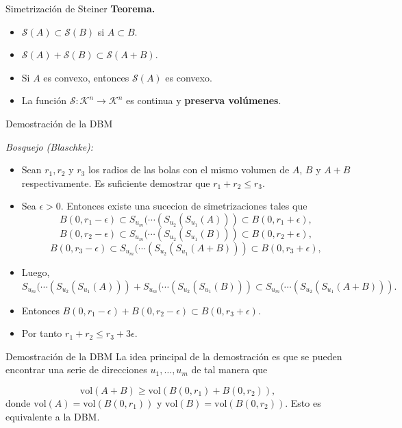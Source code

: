 \documentclass{beamer}
\newcommand{\vol}{\mathrm{vol}}
\begin{document}
\begin{frame}{Simetrización de Steiner}
\textbf{Teorema.}
    \begin{itemize}
        \item $\mathcal{S}(A) \subset \mathcal{S}(B)$ si $A \subset B$.
        \item $\mathcal{S}(A) + \mathcal{S}(B) \subset \mathcal{S}(A+B).$
        \item Si $A$ es convexo, entonces $\mathcal{S}(A)$ es convexo.
        \item La función $\mathcal{S}: \mathcal{K}^n \rightarrow \mathcal{K}^n$ es continua y \textbf{preserva volúmenes}. 
    \end{itemize}
\end{frame}


\begin{frame}{Demostración de la DBM}

\textit{Bosquejo (Blaschke):}
\begin{itemize}[<+->]
    \item Sean $r_1, r_2$ y $r_3$ los radios de las bolas con el mismo volumen de $A$, $B$ y $A+B$ respectivamente. Es suficiente demostrar que $r_1 + r_2 \leq r_3.$
    \item Sea $\epsilon > 0$. Entonces existe una sucecion de simetrizaciones tales que 
    $$B(0, r_1-\epsilon) \subset S_{u_m}(\cdots (S_{u_2}(S_{u_1}(A))) \subset B(0, r_1 + \epsilon),$$
    $$B(0, r_2-\epsilon) \subset S_{u_m}(\cdots (S_{u_2}(S_{u_1}(B))) \subset B(0, r_2 + \epsilon),$$
    $$B(0, r_3-\epsilon) \subset S_{u_m}(\cdots (S_{u_2}(S_{u_1}(A+B))) \subset B(0, r_3 + \epsilon),$$
    \item  Luego, $S_{u_m}(\cdots (S_{u_2}(S_{u_1}(A))) + S_{u_m}(\cdots (S_{u_2}(S_{u_1}(B))) \subset S_{u_m}(\cdots (S_{u_2}(S_{u_1}(A+B))).$
    \item Entonces $B(0, r_1 - \epsilon) + B(0, r_2 - \epsilon) \subset B(0, r_3 + \epsilon)$.
    \item Por tanto $r_1 + r_2 \leq r_3 + 3 \epsilon.$
\end{itemize}
    
\end{frame}

\begin{frame}{Demostración de la DBM}
La idea principal de la demostración es que se pueden encontrar una serie de direcciones $u_1, \ldots, u_m$ de tal manera que 

$$\vol(A + B) \geq \vol(B(0, r_1) + B(0, r_2)),$$
donde $\vol(A) = \vol(B(0, r_1))$ y $\vol(B) = \vol(B(0, r_2)).$ Esto es equivalente a la DBM. 
    
\end{frame}
\end{document}

